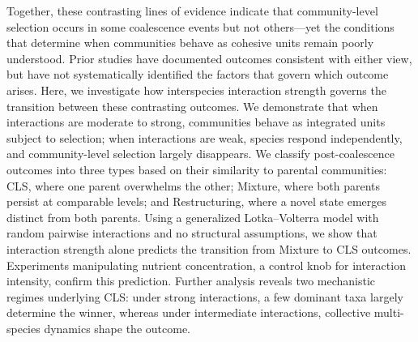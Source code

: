 Together, these contrasting lines of evidence indicate that community-level selection occurs in some coalescence events but not others---yet the conditions that determine when communities behave as cohesive units remain poorly understood. Prior studies have documented outcomes consistent with either view, but have not systematically identified the factors that govern which outcome arises. Here, we investigate how interspecies interaction strength governs the transition between these contrasting outcomes. We demonstrate that when interactions are moderate to strong, communities behave as integrated units subject to selection; when interactions are weak, species respond independently, and community-level selection largely disappears. We classify post-coalescence outcomes into three types based on their similarity to parental communities: CLS, where one parent overwhelms the other; Mixture, where both parents persist at comparable levels; and Restructuring, where a novel state emerges distinct from both parents. Using a generalized Lotka--Volterra model with random pairwise interactions and no structural assumptions, we show that interaction strength alone predicts the transition from Mixture to CLS outcomes. Experiments manipulating nutrient concentration, a control knob for interaction intensity, confirm this prediction. Further analysis reveals two mechanistic regimes underlying CLS: under strong interactions, a few dominant taxa largely determine the winner, whereas under intermediate interactions, collective multi-species dynamics shape the outcome.
